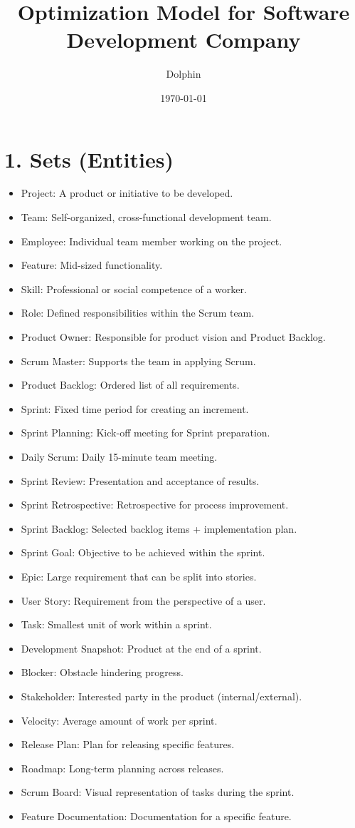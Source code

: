 \documentclass{article}
\title{Optimization Model for Software Development Company}
\author{Dolphin}
\date{\today}
\begin{document}
\maketitle
\tableofcontents

\section*{1. Sets (Entities)}
\begin{itemize}
    \item Project: A product or initiative to be developed.
    \item Team: Self-organized, cross-functional development team.
    \item Employee: Individual team member working on the project.
    \item Feature: Mid-sized functionality.
    \item Skill: Professional or social competence of a worker.
    \item Role: Defined responsibilities within the Scrum team.
    \item Product Owner: Responsible for product vision and Product Backlog.
    \item Scrum Master: Supports the team in applying Scrum.
    \item Product Backlog: Ordered list of all requirements.
    \item Sprint: Fixed time period for creating an increment.
    \item Sprint Planning: Kick-off meeting for Sprint preparation.
    \item Daily Scrum: Daily 15-minute team meeting.
    \item Sprint Review: Presentation and acceptance of results.
    \item Sprint Retrospective: Retrospective for process improvement.
    \item Sprint Backlog: Selected backlog items + implementation plan.
    \item Sprint Goal: Objective to be achieved within the sprint.
    \item Epic: Large requirement that can be split into stories.
    \item User Story: Requirement from the perspective of a user.
    \item Task: Smallest unit of work within a sprint.
    \item Development Snapshot: Product at the end of a sprint.
    \item Blocker: Obstacle hindering progress.
    \item Stakeholder: Interested party in the product (internal/external).
    \item Velocity: Average amount of work per sprint.
    \item Release Plan: Plan for releasing specific features.
    \item Roadmap: Long-term planning across releases.
    \item Scrum Board: Visual representation of tasks during the sprint.
    \item Feature Documentation: Documentation for a specific feature.
\end{itemize}
\end{document}
